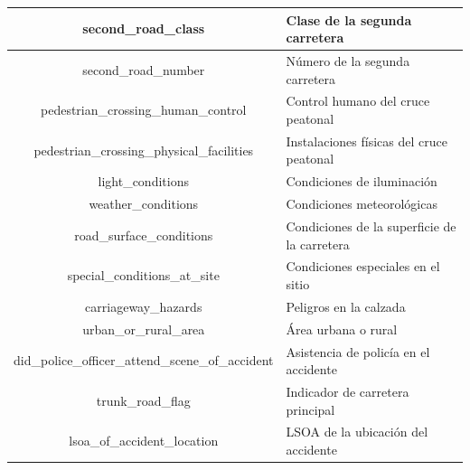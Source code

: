 \begin{table}[H]
\begin{center}
\begin{tabular}{|c|l|}
			second\_road\_class & Clase de la segunda carretera \\ \hline
			second\_road\_number & Número de la segunda carretera \\ \hline
			pedestrian\_crossing\_human\_control & Control humano del cruce peatonal \\ \hline
			pedestrian\_crossing\_physical\_facilities & Instalaciones físicas del cruce peatonal \\ \hline
			light\_conditions & Condiciones de iluminación \\ \hline
			weather\_conditions & Condiciones meteorológicas \\ \hline
			road\_surface\_conditions & Condiciones de la superficie de la carretera \\ \hline
			special\_conditions\_at\_site & Condiciones especiales en el sitio \\ \hline
			carriageway\_hazards & Peligros en la calzada \\ \hline
			urban\_or\_rural\_area & Área urbana o rural \\ \hline
			did\_police\_officer\_attend\_scene\_of\_accident & Asistencia de policía en el accidente \\ \hline
			trunk\_road\_flag & Indicador de carretera principal \\ \hline
			lsoa\_of\_accident\_location & LSOA de la ubicación del accidente \\ \hline
		\end{tabular}
	\end{center}

	\label{UK_ACCIDENT_TABLE}
\end{table} 

